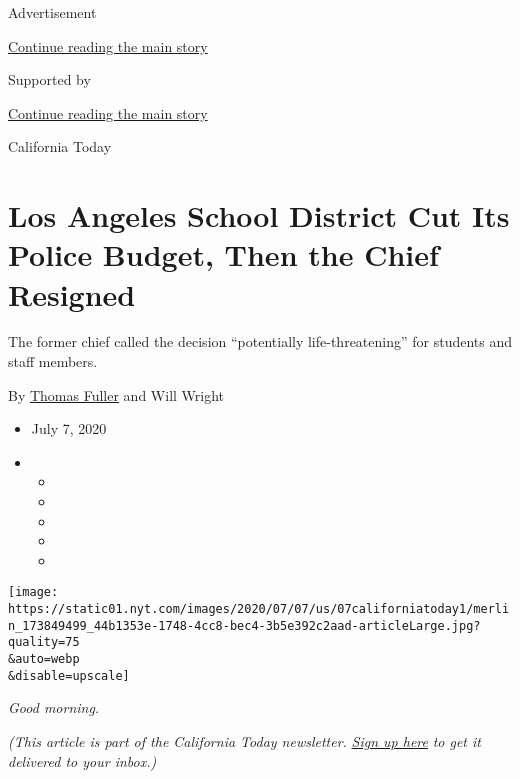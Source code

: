 Advertisement

\protect\hyperlink{after-top}{Continue reading the main story}

Supported by

\protect\hyperlink{after-sponsor}{Continue reading the main story}

California Today

\hypertarget{los-angeles-school-district-cut-its-police-budget-then-the-chief-resigned}{%
\section{Los Angeles School District Cut Its Police Budget, Then the
Chief
Resigned}\label{los-angeles-school-district-cut-its-police-budget-then-the-chief-resigned}}

The former chief called the decision ``potentially life-threatening''
for students and staff members.

By \href{https://www.nytimes.com/by/thomas-fuller}{Thomas Fuller} and
Will Wright

\begin{itemize}
\item
  July 7, 2020
\item
  \begin{itemize}
  \item
  \item
  \item
  \item
  \item
  \end{itemize}
\end{itemize}

\texttt{[image: https://static01.nyt.com/images/2020/07/07/us/07californiatoday1/merlin\_173849499\_44b1353e-1748-4cc8-bec4-3b5e392c2aad-articleLarge.jpg?quality=75\\\&auto=webp\\\&disable=upscale]}

\emph{Good morning.}

\emph{(This article is part of the California Today newsletter.}
\href{https://nl.nytimes.com/f/a/M0CriPlnjUtA-B6ZFjDGfA~~/AAAAAQA~/RgRg1yvzP0TOaHR0cHM6Ly93d3cubnl0aW1lcy5jb20vbmV3c2xldHRlcnMvY2FsaWZvcm5pYS10b2RheT9jYW1wYWlnbl9pZD00OSZlbWM9ZWRpdF9jYV8yMDIwMDYyNSZpbnN0YW5jZV9pZD0xOTcwNCZubD1jYWxpZm9ybmlhLXRvZGF5JnJlZ2lfaWQ9Njg1MTk1NzMmc2VnbWVudF9pZD0zMTgzMSZ0ZT0xJnVzZXJfaWQ9YWM0Y2EyOTY2ZDMzMTZiMmUyZjZmZmJiNmE1ODQxOTJXA255dEIKADzzpvRempqTllIbbWFyaWUubWNkZXJtb3R0QG55dGltZXMuY29tWAQAAAAA}{\emph{Sign
up here}} \emph{to get it delivered to your inbox.)}

